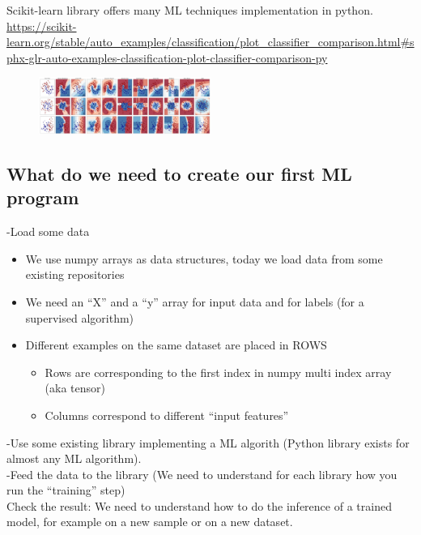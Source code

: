 Scikit-learn library offers many ML techniques implementation in python.\\
\url{https://scikit-learn.org/stable/auto_examples/classification/plot_classifier_comparison.html#sphx-glr-auto-examples-classification-plot-classifier-comparison-py}

\begin{figure}[ht]
	\centering
	\includegraphics[width=0.5\textwidth]{figure_ml/scikit.png}
\end{figure}
\FloatBarrier

\subsection{What do we need to create our first ML program}

-Load some data
\begin{itemize}
	\item We use numpy arrays as data structures, today we load data from some existing repositories
	\item We need an “X” and a “y” array for input data and for labels (for a supervised algorithm)
	\item Different examples on the same dataset are placed in ROWS
	\begin{itemize}
		\item Rows are corresponding to the first index in numpy multi index array (aka tensor)
		\item Columns correspond to different “input features”
	\end{itemize}
\end{itemize}

-Use some existing library implementing a ML algorith (Python library exists for almost any ML algorithm).\\

-Feed the data to the library (We need to understand for each library how you run the “training” step)\\

Check the result: We need to understand how to do the inference of a trained model, for example on a new sample or on a new dataset.



